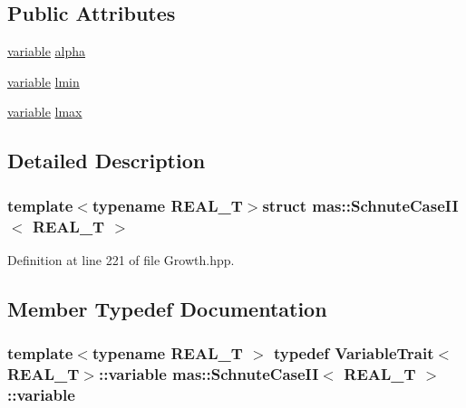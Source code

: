 \subsection*{Public Attributes}
\begin{DoxyCompactItemize}
\item 
\hyperlink{structmas_1_1_schnute_case_i_i_a44a5def50d599f85b1c0fbe1b44f139b}{variable} \hyperlink{structmas_1_1_schnute_case_i_i_aab10fd7b8522029960059666e872c461}{alpha}
\item 
\hyperlink{structmas_1_1_schnute_case_i_i_a44a5def50d599f85b1c0fbe1b44f139b}{variable} \hyperlink{structmas_1_1_schnute_case_i_i_ab7ff973aeb99b0e7f714ba5bdefcba10}{lmin}
\item 
\hyperlink{structmas_1_1_schnute_case_i_i_a44a5def50d599f85b1c0fbe1b44f139b}{variable} \hyperlink{structmas_1_1_schnute_case_i_i_a2f33253a32b5b0680cbacfa1f5e29f64}{lmax}
\end{DoxyCompactItemize}


\subsection{Detailed Description}
\subsubsection*{template$<$typename R\-E\-A\-L\-\_\-\-T$>$struct mas\-::\-Schnute\-Case\-I\-I$<$ R\-E\-A\-L\-\_\-\-T $>$}



Definition at line 221 of file Growth.\-hpp.



\subsection{Member Typedef Documentation}
\hypertarget{structmas_1_1_schnute_case_i_i_a44a5def50d599f85b1c0fbe1b44f139b}{
\subsubsection[{variable}]{\setlength{\rightskip}{0pt plus 5cm}template$<$typename R\-E\-A\-L\-\_\-\-T $>$ typedef {\bf Variable\-Trait}$<$R\-E\-A\-L\-\_\-\-T$>$\-::{\bf variable} {\bf mas\-::\-Schnute\-Case\-I\-I}$<$ R\-E\-A\-L\-\_\-\-T $>$\-::{\bf variable}}}\label{structmas_1_1_schnute_case_i_i_a44a5def50d599f85b1c0fbe1b44f139b}


